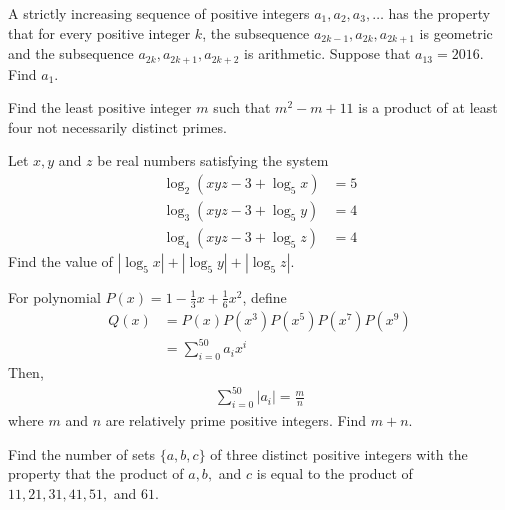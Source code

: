 \documentclass[problems.tex]{subfile}
\begin{document}
	\begin{problem}
		A strictly increasing sequence of positive integers $a_1, a_2, a_3, \ldots$ has the property that for every positive integer $k$, the subsequence $a_{2k-1}, a_{2k}, a_{2k+1}$ is geometric and the subsequence $a_{2k}, a_{2k+1}, a_{2k+2}$ is arithmetic. Suppose that $a_{13} = 2016$. Find $a_1$. %
	\end{problem}

	\begin{problem}
		Find the least positive integer $m$ such that $m^2 - m + 11$ is a product of at least four not necessarily distinct primes. %
	\end{problem}

	\begin{problem}
		Let $x,y$ and $z$ be real numbers satisfying the system
			\begin{align*}
				\log_2(xyz-3+\log_5 x) &= 5\\
				\log_3(xyz-3+\log_5 y) &= 4 \\
				\log_4(xyz-3+\log_5 z) &= 4
			\end{align*}
		Find the value of $|\log_5 x|+|\log_5 y|+|\log_5 z|$. %
	\end{problem}

	\begin{problem}
		For polynomial $P(x)=1-\frac{1}{3}x+\frac{1}{6}x^2$, define
			\begin{align*}
				Q(x)
					& = P(x)P(x^3)P(x^5)P(x^7)P(x^9)\\
					& = \sum\limits_{i=0}^{50}a_ix^i
			\end{align*}
		Then,
			\begin{align*}
				\sum\limits_{i=0}^{50}|a_i|=\frac{m}{n}
			\end{align*}
		where $m$ and $n$ are relatively prime positive integers. Find $m+n$. %
	\end{problem}

	\begin{problem}
		Find the number of sets $\{a,b,c\}$ of three distinct positive integers with the property that the product of $a,b,$ and $c$ is equal to the product of $11,21,31,41,51,$ and $61$. %
	\end{problem}
\end{document}
